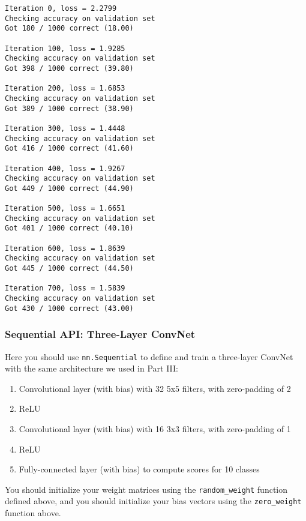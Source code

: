 \documentclass[11pt]{article}
\providecommand{\tightlist}{%
      \setlength{\itemsep}{0pt}\setlength{\parskip}{0pt}}
\begin{document}
    \begin{Verbatim}[commandchars=\\\{\}]
Iteration 0, loss = 2.2799
Checking accuracy on validation set
Got 180 / 1000 correct (18.00)

Iteration 100, loss = 1.9285
Checking accuracy on validation set
Got 398 / 1000 correct (39.80)

Iteration 200, loss = 1.6853
Checking accuracy on validation set
Got 389 / 1000 correct (38.90)

Iteration 300, loss = 1.4448
Checking accuracy on validation set
Got 416 / 1000 correct (41.60)

Iteration 400, loss = 1.9267
Checking accuracy on validation set
Got 449 / 1000 correct (44.90)

Iteration 500, loss = 1.6651
Checking accuracy on validation set
Got 401 / 1000 correct (40.10)

Iteration 600, loss = 1.8639
Checking accuracy on validation set
Got 445 / 1000 correct (44.50)

Iteration 700, loss = 1.5839
Checking accuracy on validation set
Got 430 / 1000 correct (43.00)

    \end{Verbatim}

    \hypertarget{sequential-api-three-layer-convnet}{%
\subsubsection{Sequential API: Three-Layer
ConvNet}\label{sequential-api-three-layer-convnet}}

Here you should use \texttt{nn.Sequential} to define and train a
three-layer ConvNet with the same architecture we used in Part III:

\begin{enumerate}
\def\labelenumi{\arabic{enumi}.}
\tightlist
\item
  Convolutional layer (with bias) with 32 5x5 filters, with zero-padding
  of 2
\item
  ReLU
\item
  Convolutional layer (with bias) with 16 3x3 filters, with zero-padding
  of 1
\item
  ReLU
\item
  Fully-connected layer (with bias) to compute scores for 10 classes
\end{enumerate}

You should initialize your weight matrices using the
\texttt{random\_weight} function defined above, and you should
initialize your bias vectors using the \texttt{zero\_weight} function
above.
\end{document}
